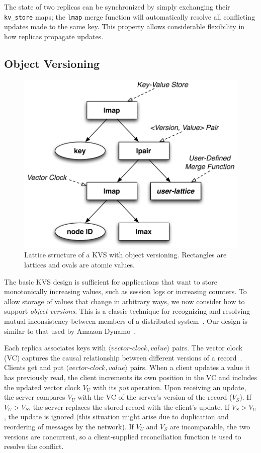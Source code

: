 The state of two replicas can be synchronized by simply exchanging their
\texttt{kv\_store} maps; the \texttt{lmap} merge function will automatically
resolve all conflicting updates made to the same key. This property allows
considerable flexibility in how replicas propagate updates.

\subsection{Object Versioning}
\label{sec:kvs-versions}
\begin{figure}[t]
\centering
\includegraphics[width=0.8\linewidth]{fig/kvs-vc-lattice.pdf}
\caption{Lattice structure of a KVS with object versioning. Rectangles are
  lattices and ovals are atomic values.}
\label{fig:kvs-vc-lattices}
\end{figure}

The basic KVS design is sufficient for applications that want to store
monotonically increasing values, such as session logs or increasing counters. To
allow storage of values that change in arbitrary ways, we now consider how to
support \emph{object versions}. This is a classic technique for recognizing and resolving
mutual inconsistency between members of a distributed system~\cite{Parker1983}.
Our design is similar to that used by Amazon Dynamo~\cite{DeCandia2007}.

Each replica associates keys with
$\langle\textit{vector-clock},\textit{value}\rangle$ pairs. The vector clock
(VC) captures the causal relationship between different versions of a
record~\cite{Fidge1988,Mattern1989}. Clients get and put
$\langle\textit{vector-clock},\textit{value}\rangle$ pairs. When a client
updates a value it has previously read, the client increments its own position
in the VC and includes the updated vector clock $V_U$ with its \emph{put}
operation. Upon receiving an update, the server compares $V_U$ with the VC of
the server's version of the record ($V_S$). If $V_U > V_S$, the server replaces
the stored record with the client's update. If $V_S > V_U$, the update is
ignored (this situation might arise due to duplication and reordering of
messages by the network). If $V_U$ and $V_S$ are incomparable, the two versions
are concurrent, so a client-supplied reconciliation function is used to resolve
the conflict.

